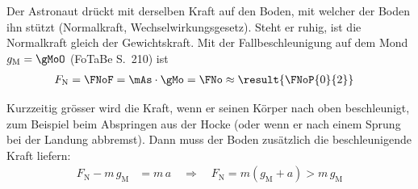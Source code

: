 Der Astronaut drückt mit derselben Kraft auf den Boden, mit welcher der Boden ihn stützt (Normalkraft, Wechselwirkungsgesetz). Steht er ruhig, ist die Normalkraft gleich der Gewichtskraft. Mit der Fallbeschleunigung auf dem Mond $g_\mathrm{M} = \gMoO$ (FoTaBe S.~210) ist
\begin{align}
 F_\mathrm{N} &= \FNoF = \mAs\cdot\gMo = \FNo \approx \result{\FNoP{0}{2}}
\end{align}

Kurzzeitig grösser wird die Kraft, wenn er seinen Körper nach oben beschleunigt, zum Beispiel beim Abspringen aus der Hocke (oder wenn er nach einem Sprung bei der Landung abbremst). Dann muss der Boden zusätzlich die beschleunigende Kraft liefern:
\begin{align}
 F_\mathrm{N} - m\,g_\mathrm{M} &= m\,a \quad\Rightarrow\quad F_\mathrm{N} = m\left(g_\mathrm{M}+a\right) > m\,g_\mathrm{M}
\end{align}
